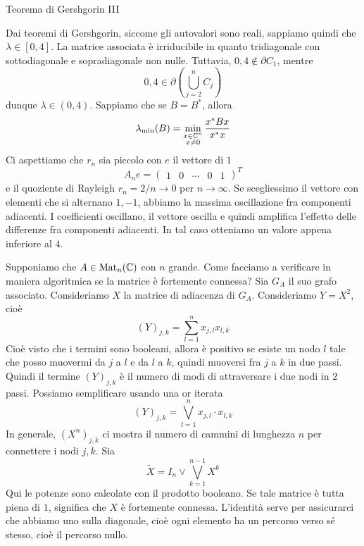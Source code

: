 \documentclass[a4paper]{article}
\begin{document}
\begin{snippetexample}{Teorema di Gershgorin III}
\begin{figure}
\begin{center}
\begin{tikzpicture}[scale=0.3]
            \end{tikzpicture}
        \end{center}
        \vspace{-3cm}
    \end{figure}
    Dai teoremi di Gershgorin, siccome gli autovalori sono reali,
    sappiamo quindi che \(\lambda \in [0,4]\).
    La matrice associata è irriducibile in quanto tridiagonale con sottodiagonale e sopradiagonale non nulle.
    Tuttavia, \(0,4 \notin \partial C_1\), mentre
    \[
        0,4 \in \partial \left(
            \bigcup_{j=2}^n C_j
        \right)
    \]
    dunque \(\lambda \in (0,4)\).
    Sappiamo che se \(B=B^*\), allora \[
        \lambda_{\text{min}}(B)
        = \min_{\substack{x \in \mathbb{C}^n \\ x \neq 0}} \frac{x^* B x}{x^* x}
    \]
    Ci aspettiamo che \(r_n\) sia piccolo con \(e\) il vettore di \(1\)
    \[
        A_n e =
        \begin{pmatrix} 1 & 0 & \cdots & 0 & 1
        \end{pmatrix}^T
    \]
    e il quoziente di Rayleigh \(r_n = 2/n \to 0\) per \(n \to \infty\).
    Se scegliessimo il vettore con elementi che si alternano \(1, -1\),
    abbiamo la massima oscillazione fra componenti adiacenti. I coefficienti oscillano,
    il vettore oscilla e quindi amplifica l'effetto delle differenze fra componenti adiacenti.
    In tal caso otteniamo un valore appena inferiore al \(4\).
    \wrapfill
\end{snippetexample}

Supponiamo che \(A \in \operatorname{Mat}_n(\mathbb{C})\) con \(n\) grande.
Come facciamo a verificare in maniera algoritmica se la matrice è fortemente connessa?
Sia \(G_A\) il suo grafo associato.
Consideriamo \(X\) la matrice di adiacenza di \(G_A\).
Consideriamo \(Y=X^2\), cioè
\[
    (Y)_{j,k} = \sum_{l=1}^n x_{j,l} x_{l,k}
\]
Cioè visto che i termini sono booleani, allora è positivo
se esiste un nodo \(l\) tale che posso muovermi da \(j\) a \(l\) e da \(l\) a \(k\),
quindi muoversi fra \(j\) a \(k\) in due passi.
Quindi il termine \((Y)_{j,k}\) è il numero di modi di attraversare i due nodi in \(2\) passi.
Possiamo semplificare usando una or iterata
\[
    (Y)_{j,k}
    = \bigvee_{l=1}^n x_{j,l} \cdot x_{l,k}
\]
In generale, \((X^n)_{j,k}\) ci mostra il numero di cammini di lunghezza \(n\)
per connettere i nodi \(j, k\).
Sia \[
    \tilde X = I_n \vee \bigvee_{k=1}^{n-1} X^k
\]
Qui le potenze sono calcolate con il prodotto booleano. Se tale matrice è tutta piena di \(1\),
significa che \(X\) è fortemente connessa.
L'identità serve per assicurarci che abbiamo uno sulla diagonale, cioè ogni elemento
ha un percorso verso sé stesso, cioè il percorso nullo.
\end{document}
